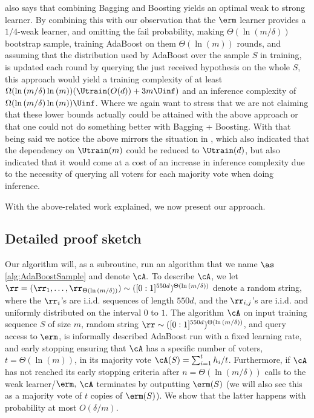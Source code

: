 \citeauthor{baggingoptimalPAClearner} also says that combining Bagging and Boosting yields an optimal weak to strong learner. By combining this with our observation that the $ \erm $ learner provides a $ 1/4 $-weak learner, and omitting the fail probability, making $ \Theta(\ln{(m/\delta )} )$ bootstrap sample, training AdaBoost on them  $ \Theta(\ln{(m )}) $ rounds, and assuming that the distribution used by AdaBoost over the sample $ S $ in training, is updated each round by querying the just received hypothesis on the whole $ S $, this approach would yield a training complexity of at least $\Omega(\ln{\left(m/\delta \right)}\ln{\left( m\right)})(\Utrain(O(d))+3m\Uinf)$ and an inference complexity of $\Omega(\ln{\left(m/\delta \right)}\ln{\left(m \right)})\Uinf$. Where we again want to stress that we are not claiming that these lower bounds actually could be attained with the above approach or that one could not do something better with \citeauthor{baggingoptimalPAClearner} Bagging + Boosting.
With that being said we notice the above mirrors the situation in \cite{Optimalweaktostronglearning}, which also indicated that the dependency on \( \Utrain(m) \) could be reduced to \( \Utrain(d) \), but also indicated that it would come at a cost of an increase in inference complexity due to the necessity of querying all voters for each majority vote when doing inference.

With the above-related work explained, we now present our approach.
\vspace{-0.3cm}

\subsection{Detailed proof sketch}

Our algorithm will, as a subroutine, run an algorithm that we name $ \as $ \cref{alg:AdaBoostSample} and denote $ \cA. $ To describe $ \cA $, we let $  \rr=(\rr_{1},\ldots,\rr_{\Theta(\ln{(m/\delta )})}) \sim([0:1]^{550d})^{\Theta(\ln{(m/\delta )})} $ denote a random string, where the $ \rr_{i} $'s are i.i.d. sequences of length $ 550d $, and the $ \rr_{i,j} $'s are i.i.d. and uniformly distributed on the interval $ 0 $ to $ 1 $. The algorithm $ \cA$ on input training sequence $S$ of size $m$, random string $ \rr \sim([0:1]^{550d})^{\Theta(\ln{(m/\delta )})}$, and query access to $\erm$, is informally described AdaBoost run with a fixed learning rate, and early stopping ensuring that $ \cA $  has a specific number of voters, $t= \Theta(\ln{\left(m \right)}) $, in its majority vote $\cA(S)= \sum_{i=1}^{t} h_i/t $. Furthermore, if $ \cA $ has not reached its early stopping criteria after $ n=\Theta(\ln(m/\delta)) $ calls to the weak learner/$ \erm,$  $ \cA $  terminates by outputting $ \erm(S) $ (we will also see this as a majority vote of $ t $ copies of $ \erm(S) $). We show that the latter happens with probability at most $O(\delta/m)$. 

